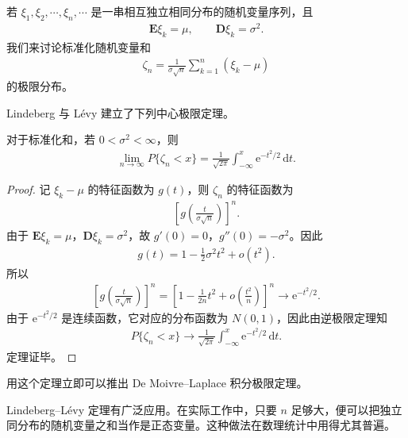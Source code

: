 \documentclass[../../main.tex]{subfiles}
\begin{document}
若 $\xi_1,\xi_2,\cdots,\xi_n,\cdots$ 是一串相互独立相同分布的随机变量序列，且
\begin{align}
\boldsymbol{E}\xi_k=\mu,\qquad \boldsymbol{D}\xi_k=\sigma^{2}.
\end{align}
我们来讨论标准化随机变量和
\begin{align}
\zeta_n=\frac{1}{\sigma\sqrt{n}}\sum_{k=1}^{n}(\xi_k-\mu)
\end{align}
的极限分布。

Lindeberg 与 Lévy 建立了下列中心极限定理。

\begin{theorem}\label{theorem:ch05-LindebergLevi}
对于标准化和，若 $0<\sigma^{2}<\infty$，则
\begin{align}
\lim_{n\to\infty}P\{\zeta_n<x\}=\frac{1}{\sqrt{2\pi}}\int_{-\infty}^{x}\mathrm{e}^{-t^{2}/2}\,\mathrm{d}t.
\end{align}
\end{theorem}

\begin{proof}
记 $\xi_k-\mu$ 的特征函数为 $g(t)$，则 $\zeta_n$ 的特征函数为
\begin{align*}
\left[g\!\left(\frac{t}{\sigma\sqrt{n}}\right)\right]^{n}.
\end{align*}
由于 $\boldsymbol{E}\xi_k=\mu$，$\boldsymbol{D}\xi_k=\sigma^{2}$，故 $g'(0)=0$，$g''(0)=-\sigma^{2}$。因此
\begin{align}
g(t)=1-\frac12\sigma^{2}t^{2}+o(t^{2}).
\end{align}
所以
\begin{align}
\left[g\!\left(\frac{t}{\sigma\sqrt{n}}\right)\right]^{n}
=\left[1-\frac{1}{2n}t^{2}+o\!\left(\frac{t^{2}}{n}\right)\right]^{n}\to\mathrm{e}^{-t^{2}/2}.
\end{align}
由于 $\mathrm{e}^{-t^{2}/2}$ 是连续函数，它对应的分布函数为 $N(0,1)$，因此由逆极限定理知
\begin{align*}
P\{\zeta_n<x\}\to\frac{1}{\sqrt{2\pi}}\int_{-\infty}^{x}\mathrm{e}^{-t^{2}/2}\,\mathrm{d}t.
\end{align*}
定理证毕。
\end{proof}

用这个定理立即可以推出 De Moivre--Laplace 积分极限定理。

Lindeberg--Lévy 定理有广泛应用。在实际工作中，只要 $n$ 足够大，便可以把独立同分布的随机变量之和当作是正态变量。这种做法在数理统计中用得尤其普遍。
\end{document}
